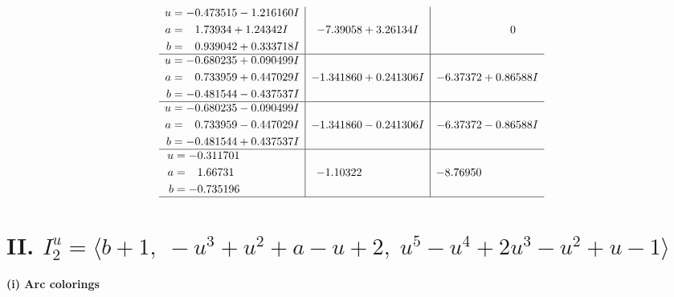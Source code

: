 \documentclass[1p]{elsarticle_modified}
\theoremstyle{definition}
\begin{document}
$$\begin{array}{c|c|c}
\begin{aligned}
u &= -0.473515 - 1.216160 I \\
a &= \phantom{-}1.73934 + 1.24342 I \\
b &= \phantom{-}0.939042 + 0.333718 I\end{aligned}
 & -7.39058 + 3.26134 I & \phantom{-0.000000 } 0 \\ \hline\begin{aligned}
u &= -0.680235 + 0.090499 I \\
a &= \phantom{-}0.733959 + 0.447029 I \\
b &= -0.481544 - 0.437537 I\end{aligned}
 & -1.341860 + 0.241306 I & -6.37372 + 0.86588 I \\ \hline\begin{aligned}
u &= -0.680235 - 0.090499 I \\
a &= \phantom{-}0.733959 - 0.447029 I \\
b &= -0.481544 + 0.437537 I\end{aligned}
 & -1.341860 - 0.241306 I & -6.37372 - 0.86588 I \\ \hline\begin{aligned}
u &= -0.311701\phantom{ +0.000000I} \\
a &= \phantom{-}1.66731\phantom{ +0.000000I} \\
b &= -0.735196\phantom{ +0.000000I}\end{aligned}
 & -1.10322\phantom{ +0.000000I} & -8.76950\phantom{ +0.000000I}\\
 \hline 
 \end{array}$$\newpage\newpage\renewcommand{\arraystretch}{1}
\centering \section*{II. $I^u_{2}= \langle b+1,\;- u^3+u^2+a- u+2,\;u^5- u^4+2 u^3- u^2+u-1 \rangle$}
\flushleft \textbf{(i) Arc colorings}\\
\end{document}
